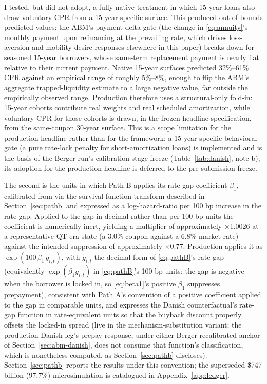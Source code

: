 \documentclass[12pt]{article}
\begin{document}
I tested, but did not adopt, a fully native treatment in which 15-year loans also draw voluntary CPR from a 15-year-specific surface. This produced out-of-bounds predicted values: the ABM's payment-delta gate (the change in \eqref{eq:annuity}'s monthly payment upon refinancing at the prevailing rate, which drives loss-aversion and mobility-desire responses elsewhere in this paper) breaks down for seasoned 15-year borrowers, whose same-term replacement payment is nearly flat relative to their current payment. Native 15-year surfaces predicted 32\%--61\% CPR against an empirical range of roughly 5\%--8\%, enough to flip the ABM's aggregate trapped-liquidity estimate to a large negative value, far outside the empirically observed range. Production therefore uses a structural-only fold-in: 15-year cohorts contribute real weights and real scheduled amortization, while voluntary CPR for those cohorts is drawn, in the frozen headline specification, from the same-coupon 30-year surface. This is a scope limitation for the production headline rather than for the framework: a 15-year-specific behavioral gate (a pure rate-lock penalty for short-amortization loans) is implemented and is the basis of the Berger run's calibration-stage freeze (Table~\ref{tab:danish}, note b); its adoption for the production headline is deferred to the pre-submission freeze.

The second is the units in which Path B applies its rate-gap coefficient $\beta_1$, calibrated from \citet{liebersohn2024} via the survival-function transform described in Section~\ref{sec:pathb} and expressed as a log-hazard-ratio per 100 bp increase in the rate gap. Applied to the gap in decimal rather than per-100 bp units the coefficient is numerically inert, yielding a multiplier of approximately $\times$1.0026 at a representative QT-era state (a 3.0\% coupon against a 6.8\% market rate) against the intended suppression of approximately $\times$0.77. Production applies it as $\exp(100\,\beta_1\,\tilde g_{i,t})$, with $\tilde g_{i,t}$ the decimal form of \eqref{eq:pathB}'s rate gap (equivalently $\exp(\beta_1 g_{i,t})$ in \eqref{eq:pathB}'s 100 bp units; the gap is negative when the borrower is locked in, so \eqref{eq:beta1}'s positive $\beta_1$ suppresses prepayment), consistent with Path A's convention of a positive coefficient applied to the gap in comparable units, and expresses the Danish counterfactual's rate-gap function in rate-equivalent units so that the buyback discount properly offsets the locked-in spread (live in the mechanism-substitution variant; the production Danish leg's prepay response, under either Berger-recalibrated anchor of Section~\ref{sec:abm-danish}, does not consume that function's classification, which is nonetheless computed, as Section~\ref{sec:pathb} discloses). Section~\ref{sec:pathb} reports the results under this convention; the superseded \$747 billion (97.7\%) microsimulation is catalogued in Appendix~\ref{app:ledger}.
\end{document}
